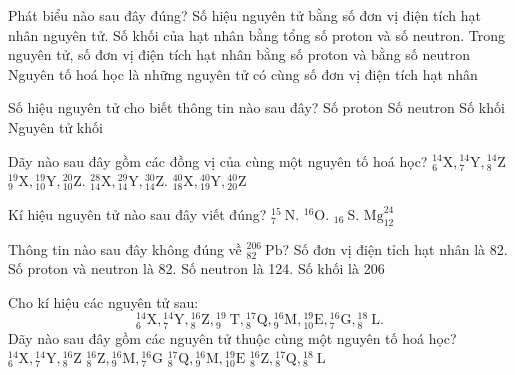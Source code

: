 \begin{ex}[2]
	Phát biểu nào sau đây  đúng?
	\choice
	{ Số hiệu nguyên tử bằng số đơn vị điện tích hạt nhân nguyên tử.}
	{ Số khối của hạt nhân bằng tổng số proton và số neutron.}
	{ \True Trong nguyên tử, số đơn vị điện tích hạt nhân bằng số proton và bằng số neutron}
	{ Nguyên tố hoá học là những nguyên tử có cùng số đơn vị điện tích hạt nhân}
	\loigiai{%
	}
\end{ex}
\begin{ex}[2]
	Số hiệu nguyên tử cho biết thông tin nào sau đây?
	\choice
	{\True Số proton}
	{ Số neutron}
	{ Số khối}
	{ Nguyên tử khối}
	\loigiai{%
	}
\end{ex}
\begin{ex}[2]
	Dãy nào sau đây gồm các đồng vị của cùng một nguyên tố hoá học?
	\choice
	{ ${ }_6^{14} \mathrm{X},{ }_7^{14} \mathrm{Y},{ }_8^{14} \mathrm{Z}$}
	{ ${ }_9^{19} \mathrm{X},{ }_{10}^{19} \mathrm{Y},{ }_{10}^{20} \mathrm{Z}$.}
	{\True ${ }_{14}^{28} \mathrm{X},{ }_{14}^{29} \mathrm{Y},{ }_{14}^{30} \mathrm{Z}$.}
	{ ${ }_{18}^{40} \mathrm{X},{ }_{19}^{40} \mathrm{Y},{ }_{20}^{40} \mathrm{Z}$}
	\loigiai{%
	}
\end{ex}
\begin{ex}[2]
	Kí hiệu nguyên tử nào sau đây viết đúng?
	\choice
	{ \True ${ }_7^{15} \mathrm{~N}$.}
	{ ${ }^{16} \mathrm{O}$.}
	{ ${ }_{16} \mathrm{~S}$.}
	{ $\mathrm{Mg}_{12}^{24}$}
	\loigiai{%
	}
\end{ex}
\begin{ex}[2]
	Thông tin nào sau đây không đúng về ${ }_{82}^{206} \mathrm{~Pb}$?
	\choice
	{ Số đơn vị điện tỉch hạt nhân là 82.}
	{ \True Số proton và neutron là 82.}
	{ Số neutron là 124.}
	{ Số khối là 206}
	\loigiai{%
	}
\end{ex}
\begin{ex}[2]
	Cho kí hiệu các nguyên tử sau:
	$$
	{ }_6^{14} \mathrm{X},{ }_7^{14} \mathrm{Y},{ }_8^{16} \mathrm{Z},{ }_9^{19} \mathrm{~T},{ }_8^{17} \mathrm{Q},{ }_9^{16} \mathrm{M},{ }_{10}^{19} \mathrm{E},{ }_7^{16} \mathrm{G},{ }_8^{18} \mathrm{~L}.
	$$
	Dãy nào sau đây gồm các nguyên tử thuộc cùng một nguyên tố hoá học?
	\choice
	{ ${ }_6^{14} \mathrm{X},{ }_7^{14} \mathrm{Y},{ }_8^{16} \mathrm{Z}$}
	{ ${ }_8^{16} \mathrm{Z},{ }_9^{16} \mathrm{M},{ }_7^{16} \mathrm{G}$}
	{ ${ }_8^{17} \mathrm{Q},{ }_9^{16} \mathrm{M},{ }_{10}^{19} \mathrm{E}$}
	{ \True ${ }_8^{16} \mathrm{Z},{ }_8^{17} \mathrm{Q},{ }_8^{18} \mathrm{~L}$}
	\loigiai{%
	}
\end{ex}
